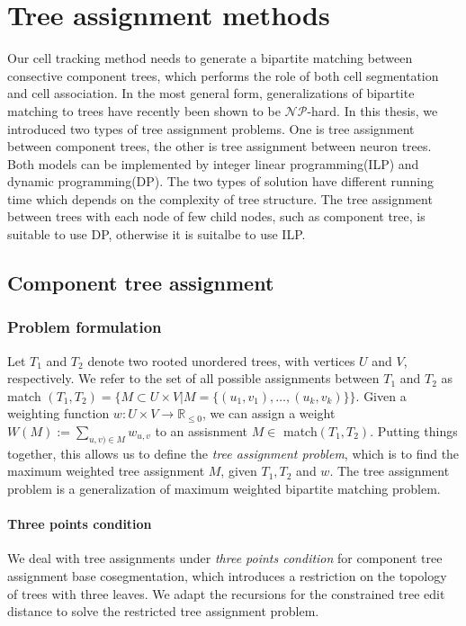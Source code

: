 \chapter{Tree assignment methods} \label{chpt:treeassign}
Our cell tracking method needs to generate a bipartite matching \cite{mosig2009tracking, Xiao:2011} between consective component trees, which performs the role of both cell segmentation and cell association. In the most general form, generalizations of bipartite matching to trees have recently been shown to be $\mathcal{NP}$-hard\cite{canzar2011tree}.
In this thesis, we introduced two types of tree assignment problems. One is tree assignment between component trees, the other is tree assignment between neuron trees. Both models can be implemented by integer linear programming(ILP) and dynamic programming(DP). The two types of solution have different running time which depends on the complexity of tree structure. The tree assignment between trees with each node of few child nodes, such as component tree, is suitable to use DP, otherwise it is suitalbe to use ILP.

\section{Component tree assignment}
\subsection{Problem formulation}
Let $T_1$ and $T_2$ denote two rooted unordered trees, with vertices $U$ and $V$, respectively.  We refer to the set of all possible assignments between $T_1$ and $T_2$ as match $(T_1,T_2) =\Big\{M \subset U \times V | M = \{(u_1,v_1),\ldots,(u_k,v_k)\}\Big\}$. Given a weighting function $w:U\times V \to \mathbb{R}_{\le 0}$, we can assign a weight $W(M) := \sum_{u,v)\in M}w_{u,v}$ to an assisnment $M \in$ match$(T_1,T_2)$. Putting things together, this allows us to define the \emph{tree assignment problem}, which is to find the maximum weighted tree assignment $M$, given $T_1,T_2$ and $w$. The tree assignment problem is a generalization of maximum weighted bipartite matching problem.
\subsubsection{Three points condition}
We deal with tree assignments under \emph{three points condition} for component tree assignment base cosegmentation, which introduces a restriction on the topology of trees with three leaves. We adapt the recursions for the constrained tree edit distance to solve the restricted tree assignment problem.

